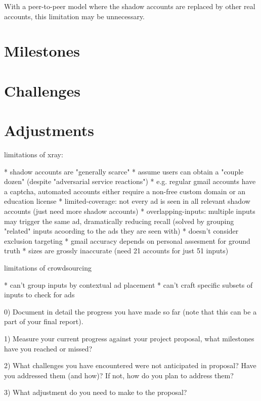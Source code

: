 \documentclass{article}
\begin{document}
With a peer-to-peer model where the shadow accounts are replaced by other real
accounts, this limitation may be unnecessary.

\section{Milestones}

\section{Challenges}

\section{Adjustments}

limitations of xray:

* shadow accounts are "generally scarce"
* assume users can obtain a "couple dozen" (despite "adversarial service reactions")
	* e.g. regular gmail accounts have a captcha, automated accounts either require a non-free custom domain or an education license
* limited-coverage: not every ad is seen in all relevant shadow accounts (just need more shadow accounts)
* overlapping-inputs: multiple inputs may trigger the same ad, dramatically reducing recall (solved by grouping "related" inputs acoording to the ads they are seen with)
* doesn't consider exclusion targeting
* gmail accuracy depends on personal assesment for ground truth
* sizes are grossly inaccurate (need 21 accounts for just 51 inputs)

limitations of crowdsourcing

* can't group inputs by contextual ad placement
* can't craft specific subsets of inputs to check for ads

0) Document in detail the progress you have made so far (note that this can be a part of your final report).
 
1) Measure your current progress against your project proposal, what milestones have you reached or missed? 
 
2) What challenges you have encountered were not anticipated in proposal? Have you addressed them (and how)? If not, how do you plan to address them?
 
3) What adjustment do you need to make to the proposal?
\end{document}
